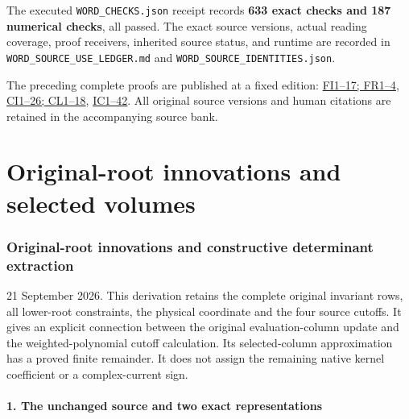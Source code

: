 \documentclass[11pt]{article}
\begin{document}
The executed \texttt{WORD\_CHECKS.json} receipt records \textbf{633 exact checks and 187 numerical checks}, all passed. The exact source versions, actual reading coverage, proof receivers, inherited source status, and runtime are recorded in \texttt{WORD\_SOURCE\_USE\_LEDGER.md} and \texttt{WORD\_SOURCE\_IDENTITIES.json}.

The preceding complete proofs are published at a fixed edition: \href{https://github.com/KokunoYumeto/zeta-function-research-reader/blob/75256b0237884bdef0074c2ac6310de1ea32ec26/workbenches/splitzero-tandem/continuations/20260921-invariant-collision/FINITE_INVARIANT_PROOFS.md}{FI1--17; FR1--4}, \href{https://github.com/KokunoYumeto/zeta-function-research-reader/blob/75256b0237884bdef0074c2ac6310de1ea32ec26/workbenches/splitzero-tandem/continuations/20260921-invariant-collision/CUTOFF_INNOVATION_PROOFS.md}{CI1--26; CL1--18}, \href{https://github.com/KokunoYumeto/zeta-function-research-reader/blob/75256b0237884bdef0074c2ac6310de1ea32ec26/workbenches/splitzero-tandem/continuations/20260921-invariant-collision/COLLISION_PROOFS.md}{IC1--42}. All original source versions and human citations are retained in the accompanying source bank.

\clearpage\part{Original-root innovations and selected volumes}
\section{Original-root innovations and constructive determinant extraction}\label{original-root-innovations-and-constructive-determinant-extraction}

21 September 2026. This derivation retains the complete original invariant rows, all lower-root constraints, the physical coordinate and the four source cutoffs. It gives an explicit connection between the original evaluation-column update and the weighted-polynomial cutoff calculation. Its selected-column approximation has a proved finite remainder. It does not assign the remaining native kernel coefficient or a complex-current sign.

\subsection{1. The unchanged source and two exact representations}\label{the-unchanged-source-and-two-exact-representations}
\end{document}
